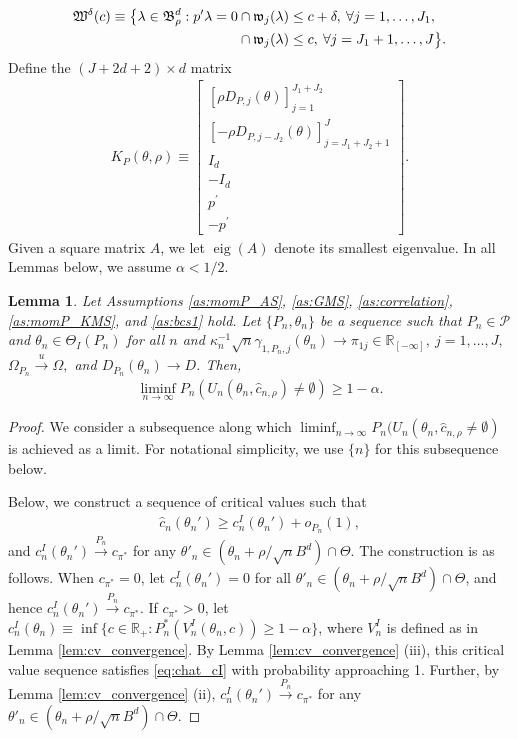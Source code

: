\documentclass[letterpaper,11pt]{article}
\theoremstyle{myplain}
\newtheorem{lemma}{Lemma}[section]
\theoremstyle{mydefinition}
\theoremstyle{myremark}
\newcommand{\uni}{\stackrel{u}{\rightarrow}}
\newcommand{\eig}{\operatorname{eig}}
\newcommand{\R}{\mathbb{R}}
\newcommand{\thetnprime}{(\theta_n +\rho /\sqrt{n} B^d)\cap \Theta}
\numberwithin{equation}{section}
\numberwithin{figure}{section}
\begin{document}
\begin{appendices}
	\begin{align}
\mathfrak W^{\delta}(c)
\equiv \big\{ \lambda\in \mathfrak B^d_\rho: p^\prime \lambda =0 &\cap \mathfrak w_{j}(\lambda)\le c+\delta , \: \forall j=1,\dots,J_1, \notag\\
&\cap \mathfrak w_{j}(\lambda)\le c , \: \forall j=J_1+1,\dots,J\big\}. \label{eq:Wdelta}
	\end{align}
Define the $(J+2d+2) \times d$ matrix
\begin{align}
K_P(\theta,\rho ) \equiv 
\begin{bmatrix}
[\rho D_{P,j}(\theta)]_{j=1}^{J_1+J_2}\\
[-\rho D_{P,j-J_2}(\theta)]_{j=J_1+J_2+1}^J\\
I_d\\
-I_d\\
p^\prime\\
-p^\prime
\end{bmatrix}. 
\end{align}
Given a square matrix $A$, we let $\eig(A)$ denote its smallest eigenvalue. 
 In all Lemmas below, we assume $\alpha<1/2$. 



\bigskip
\begin{lemma}\label{lem:val}
Let Assumptions \ref{as:momP_AS}, \ref{as:GMS}, \ref{as:correlation}, \ref{as:momP_KMS}, and \ref{as:bcs1} hold. Let $\{P_n,\theta_n\}$ be a sequence such that $P_n\in\mathcal P$ and $\theta_n \in \Theta_I(P_n)$ for all $n$ and $\kappa_n^{-1}\sqrt{n}\gamma_{1,P_n,j}(\theta_n) \to \pi_{1j} \in \R_{[-\infty]},~j=1,\dots,J,$
$\Omega_{P_n} \uni \Omega,$ and
$D_{P_n}(\theta_n) \to D$.
Then,
\begin{align}
\liminf_{n \to \infty} P_n\left( U_n(\theta_n,\hat{c}_{n,\rho})\neq \emptyset \right) \ge 1-\alpha.
\label{eq:validity}
\end{align}
\end{lemma}

\begin{proof}
We consider a subsequence along which $ \liminf_{n\to\infty}P_n(U_{n}(\theta_{n},\hat{c}_{n,\rho}\ne\emptyset)$ is achieved as a limit. For notational simplicity, we use $\{n\}$ for this subsequence below.
	
Below, we construct a sequence of critical values  such that
\begin{align}
	\hat c_n(\theta_n')\ge c^{I}_n(\theta_n')+ o_{P_n}(1),\label{eq:chat_cI}
\end{align} 
and $c^{I}_n(\theta_n')\stackrel{P_n}{\to} c_{\pi^*}$ for any $\theta'_n\in \thetnprime$. The construction is as follows. When $c_{\pi^*}=0$, let $c^{I}_n(\theta_n')=0$ for all $\theta'_n\in \thetnprime$, and hence $c^{I}_n(\theta_n')\stackrel{P_n}{\to} c_{\pi^*}$. If $c_{\pi^*}>0$, let $c^I_n(\theta_n)\equiv \inf\{c\in\R_+:P^*_n(V^I_n(\theta_n,c))\ge 1-\alpha\}$, where $V^I_n$ is defined as in Lemma \ref{lem:cv_convergence}. By Lemma \ref{lem:cv_convergence} (iii), this critical value sequence satisfies \eqref{eq:chat_cI} with probability approaching 1.
Further, by Lemma \ref{lem:cv_convergence} (ii), $c^{I}_n(\theta_n')\stackrel{P_n}{\to} c_{\pi^*}$ for any $\theta'_n\in \thetnprime$.


\end{proof}
\end{appendices}
\end{document}
